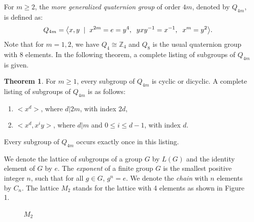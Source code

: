 \documentclass{article}
\theoremstyle{definition}
\newtheorem{theorem}{Theorem}[section]
\begin{document}
For $m\ge 2$, the \emph{more generalized quaternion group} of order $4m$, denoted by $Q_{4m}$, is defined as:
\begin{equation*}
    Q_{4m}=\bigl<x,y \hspace{0.2cm}|\hspace{0.2cm} x^{2m}=e=y^4, \hspace{0.2cm} yxy^{-1}=x^{-1}, \hspace{0.2cm} x^m=y^2 \bigr>.
\end{equation*}
Note that for $m=1,2$, we have $Q_4\cong \mathbb{Z}_4$ and $Q_8$ is the usual quaternion group with 8 elements. 
In the following theorem, a complete listing of subgroups of $Q_{4m}$ is given.
\begin{theorem} \cite{conradquad}
    For $m\ge 1$, every subgroup of $Q_{4m}$ is cyclic or dicyclic. A complete listing of subgroups of $Q_{4m}$ is as follows:
    \begin{enumerate}
        \item $\bigl<x^d\bigr>$, where $d|2m$, with index $2d$,
        \item $\bigl<x^d,x^iy\bigr>$, where $d|m$ and $0\le i \le d-1$, with index $d$.
    \end{enumerate}
    Every subgroup of $Q_{4m}$ occurs exactly once in this listing.
\end{theorem}
 We denote the lattice of subgroups of a group $G$ by $L(G)$ and the identity element of $G$ by $e$. The \emph{exponent} of a finite group $G$ is the smallest positive integer $n$, such that for all $g\in G$, $g^n=e$. We denote the \emph{chain} with $n$ elements by $C_n$. The lattice $M_2$ stands for the lattice with 4 elements as shown in Figure 1.
 \begin{figure}[h]
    \centering
        \caption{$M_2$}
\end{figure}\\
\end{document}
